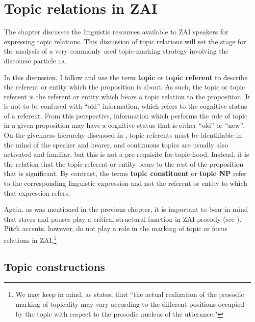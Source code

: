 \chapter{Topic relations in ZAI}\label{topicchapter}

The chapter discusses the linguistic resources available to ZAI speakers for expressing topic relations. This discussion of topic relations will set the stage for the analysis of a very commonly used topic-marking strategy involving the discourse particle \textsc{la}.

In this discussion, I follow \citet{lambrecht1994} and use the term \textbf{topic} or \textbf{topic referent} to describe the referent or entity which the proposition is about. As such, the topic or topic referent is the referent or entity which bears a topic relation to the proposition. It is not to be confused with ``old'' information, which refers to the cognitive status of a referent. From this perspective, information which performs the role of topic in a given proposition may have a cognitive status that is either ``old'' or ``new''. On the givenness hierarchy discussed in , topic referents must be identifiable in the mind of the speaker and hearer, and continuous topics are usually also activated and familiar, but this is not a pre-requisite for topic-hood. Instead, it is the relation that the topic referent or entity bears to the rest of the proposition that is significant. By contrast, the terms \textbf{topic constituent} or \textbf{topic NP} refer to the corresponding linguistic expression and not the referent or entity to which that expression refers. 

Again, as was mentioned in the previous chapter, it is important to bear in mind that stress and pauses play a critical structural function in ZAI prosody (see ). Pitch accents, however, do not play a role in the marking of topic or focus relations in ZAI.\footnote{We may keep in mind, as \citet[15]{crocco2009} states, that ``the actual realization of the prosodic marking of topicality may vary according to the different positions occupied by the topic with respect to the prosodic nucleus of the utterance."} 

 

\section{Topic constructions}\label{topicconstructionssection}


